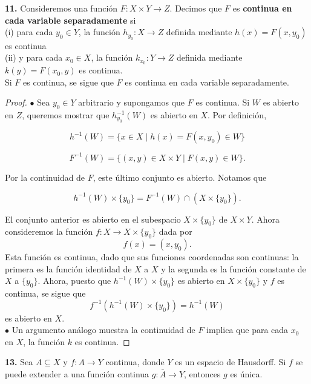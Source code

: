 \documentclass{article}
\begin{document}
\begin{mybox}
	\textbf{11. } Consideremos una función $F: X \times Y \rightarrow Z$. Decimos que $F$ es \textbf{continua en cada variable separadamente} si \\
	
	(i) para cada $y_{0} \in Y$, la función $h_{y_{0}}: X \rightarrow Z$ definida mediante $h(x) = F(x, y_{0})$ es continua \\
	
	(ii) y para cada $x_{0} \in X$, la función $k_{x_{0}}: Y \rightarrow Z$ definida mediante $k(y) = F(x_{0}, y)$ es continua. \\
	
	Si $F$ es continua, se sigue que $F$ es continua en cada variable separadamente. 
\end{mybox}	
\begin{proof}
	$\bullet$ Sea $y_{0} \in Y$ arbitrario y supongamos que $F$ es continua. Si $W$ es abierto en $Z$, queremos mostrar que $h_{y_{0}}^{-1}(W)$ es abierto en $X$. Por definición,
	
	$$ h^{-1}(W) = \{ x \in X \mid h(x) =  F(x, y_{0}) \in W \} $$
	
	$$ F^{-1}(W) = \{ (x, y) \in X \times Y \mid F(x, y) \in W \} .$$
	
	Por la continuidad de $F$, este último conjunto es abierto. Notamos que 
	
	$$ h^{-1}(W) \times \{ y_{0} \} = F^{-1}(W) \cap (X \times \{ y_{0} \}) .$$
	
	El conjunto anterior es abierto en el subespacio $X \times \{ y_{0} \}$ de $X \times Y$. Ahora consideremos la función $f:X \rightarrow X \times \{ y_{0} \}$ dada por 
	$$ f(x) = (x, y_{0}). $$
	Esta función es continua, dado que sus funciones coordenadas son continuas: la primera es la función identidad de $X$ a $X$ y la segunda es la función constante de $X$ a $\{ y_{0} \}$. Ahora, puesto que $h^{-1}(W) \times \{ y_{0} \}$ es abierto en $X \times \{ y_{0} \}$ y $f$ es continua, se sigue que 
	$$ f^{-1}( h^{-1}(W) \times \{ y_{0} \} ) = h^{-1}(W)$$
	es abierto en $X$.  \\
	
$\bullet$ Un argumento análogo muestra la continuidad de $F$ implica que para cada $x_{0}$ en $X$, la función $k$ es continua. 
\end{proof}

\newpage

\begin{mybox}
	\textbf{13. } Sea $A \subseteq X$ y $f: A \rightarrow Y$ continua, donde $Y$ es un espacio de Hausdorff. Si $f$ se puede extender a una función continua $g: \bar{A} \rightarrow Y$, entonces $g$ es única. 
\end{mybox}	
\end{document}
